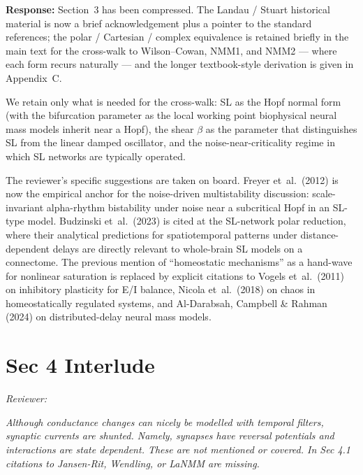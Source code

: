\documentclass[12pt,a4paper]{article}
\newcommand{\reviewercomment}[1]{\par\smallskip\noindent\textit{Reviewer:}\par\smallskip\begingroup\itshape #1\par\endgroup\smallskip}
\newcommand{\ourresponse}[1]{\par\noindent\textbf{Response:} #1\par\medskip}
\begin{document}
\ourresponse{Section~3 has been compressed. The Landau / Stuart historical material is now a brief acknowledgement plus a pointer to the standard references; the polar / Cartesian / complex equivalence is retained briefly in the main text for the cross-walk to Wilson--Cowan, NMM1, and NMM2 — where each form recurs naturally — and the longer textbook-style derivation is given in Appendix~C.

We retain only what is needed for the cross-walk: SL as the Hopf normal form (with the bifurcation parameter as the local working point biophysical neural mass models inherit near a Hopf), the shear $\beta$ as the parameter that distinguishes SL from the linear damped oscillator, and the noise-near-criticality regime in which SL networks are typically operated.

The reviewer's specific suggestions are taken on board. Freyer et~al.~(2012) is now the empirical anchor for the noise-driven multistability discussion: scale-invariant alpha-rhythm bistability under noise near a subcritical Hopf in an SL-type model. Budzinski et~al.~(2023) is cited at the SL-network polar reduction, where their analytical predictions for spatiotemporal patterns under distance-dependent delays are directly relevant to whole-brain SL models on a connectome. The previous mention of ``homeostatic mechanisms'' as a hand-wave for nonlinear saturation is replaced by explicit citations to Vogels et~al.~(2011) on inhibitory plasticity for E/I balance, Nicola et~al.~(2018) on chaos in homeostatically regulated systems, and Al-Darabsah, Campbell \& Rahman (2024) on distributed-delay neural mass models.}

\section*{Sec 4 Interlude}

\reviewercomment{Although conductance changes can nicely be modelled with temporal filters, synaptic currents are shunted. Namely, synapses have reversal potentials and interactions are state dependent. These are not mentioned or covered. In Sec 4.1 citations to Jansen-Rit, Wendling, or LaNMM are missing.}
\end{document}
